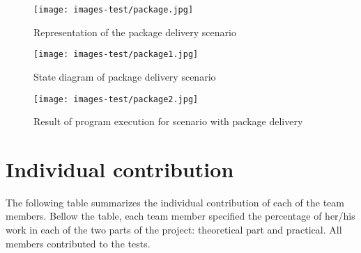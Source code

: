 \documentclass[a4paper]{article}
\begin{document}
\begin{figure}[htp]
    \centering
    \texttt{[image: images-test/package.jpg]}
    \caption{Representation of the package delivery scenario}
    \label{fig:ysp14}
\end{figure}
\begin{figure}[htp]
    \centering
    \texttt{[image: images-test/package1.jpg]}
    \caption{State diagram of package delivery scenario}
    \label{fig:ysp15}
\end{figure}
\begin{figure}[htp]
    \centering
    \texttt{[image: images-test/package2.jpg]}
    \caption{Result of program execution for scenario with package delivery}
    \label{fig:ysp16}
\end{figure}


\section{Individual contribution}
%
The following table summarizes the individual contribution of each of the team members. Bellow the table, each team member specified the percentage of her/his work in each of the two parts of the project: theoretical part and practical. All members contributed to the tests.
\end{document}
